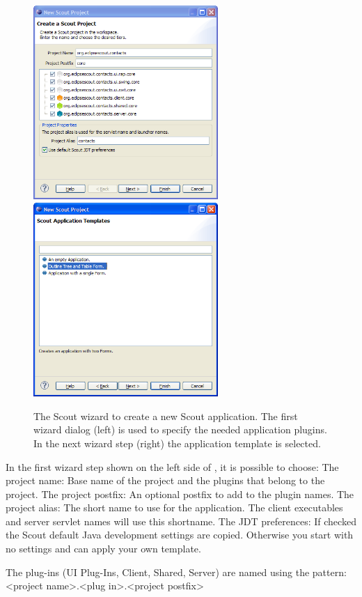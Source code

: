\documentclass[a4paper,10pt,twoside]{book}
\begin{document}
\begin{figure}
\includegraphics[width=7cm]{wizard_new_project_1.png} \hspace{5mm}
\includegraphics[width=7cm]{wizard_new_project_2.png}
\caption{The Scout wizard to create a new Scout application.
The first wizard dialog (left) is used to specify the needed application plugins. 
In the next wizard step (right) the application template is selected.}
\end{figure}

In the first wizard step shown on the left side of , it is possible to choose:
    The project name: Base name of the project and the plugins that belong to the project.
    The project postfix: An optional postfix to add to the plugin names.
    The project alias: The short name to use for the application. The client executables and server servlet names will use this shortname.
    The JDT preferences: If checked the Scout default Java development settings are copied. Otherwise you start with no settings and can apply your own template. 

The plug-ins (UI Plug-Ins, Client, Shared, Server) are named using the pattern:
 <project name>.<plug in>.<project postfix>
\end{document}
